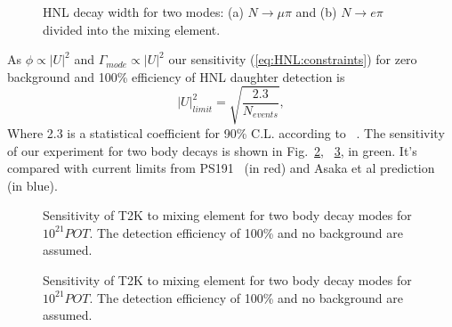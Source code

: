 \documentclass[../main.tex]{subfiles}
\begin{document}
\begin{figure}[!ht]
    \begin{minipage}[!ht]{0.49\linewidth}
    \end{minipage}
    \hfill
    \begin{minipage}[!ht]{0.49\linewidth}
    \end{minipage}
    \caption{HNL decay width for two modes: (a) $N\to \mu\pi$ and (b) $N\to e\pi$ divided into the mixing element.}
    \label{fig:HNL:decBr}
\end{figure}

As $\phi\propto\left|U\right|^2$ and $\Gamma_{mode}\propto\left|U\right|^2$ our sensitivity (\autoref{eq:HNL:constraints}) for zero background and 100\% efficiency of HNL daughter detection is
\begin{equation}
    \left|U\right|^2_{limit}=\sqrt{\frac{2.3}{N_{events}}},
\end{equation}
Where 2.3 is a statistical coefficient for 90\% C.L. according to ~\cite{Cousins1992}. The sensitivity of our experiment for two body decays is shown in Fig.~\ref{fig:HNL:Ue2Umu2TwoBody}, ~\ref{fig:HNL:UeUmuTwoBody}, in green. It's compared with current limits from PS191~\cite{Bernardi1988} (in red) and Asaka et al prediction~\cite{Asaka2012} (in blue).
\begin{figure}[!ht]
    \begin{minipage}[!ht]{0.49\linewidth}
    \end{minipage}
    \hfill
    \begin{minipage}[!ht]{0.49\linewidth}
    \end{minipage}
    \caption{Sensitivity of T2K to mixing element for two body decay modes for $10^{21}POT$. The detection efficiency of 100\% and no background are assumed.}
    \label{fig:HNL:Ue2Umu2TwoBody}
\end{figure}

\begin{figure}[!ht]
    \caption{Sensitivity of T2K to mixing element for two body decay modes for $10^{21}POT$. The detection efficiency of 100\% and no background are assumed.}
    \label{fig:HNL:UeUmuTwoBody}
\end{figure}
\end{document}
